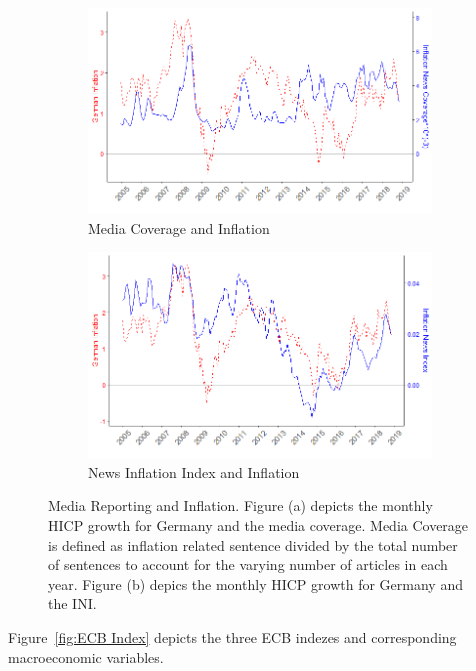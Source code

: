 \documentclass[review]{elsarticle}
\begin{document}
   \begin{figure}[h!]
    \centering
\begin{subfigure}{6cm}
    \includegraphics{Inflation_Count.png}
    \caption{Media Coverage and Inflation}
    \label{10}
\end{subfigure}
\hfil
\begin{subfigure}{6cm}
    \includegraphics{Inflation_Sentiment_Direction.png}
    \caption{News Inflation Index and Inflation}
    \label{100}
\end{subfigure}
\caption{Media Reporting and Inflation. Figure (a) depicts the monthly HICP growth for Germany and the media coverage. Media Coverage is defined as inflation related sentence divided by the total number of sentences to account for the varying number of articles in each year. Figure (b) depics the monthly HICP growth for Germany and the INI.}
\label{fig:News Index}
    \end{figure}

Figure~\ref{fig:ECB Index} depicts the three ECB indezes and corresponding macroeconomic variables. 
\end{document}
